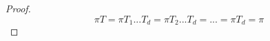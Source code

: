 \begin{proof}
	\begin{equation*}
		\pi T = \pi T_1...T_d = \pi T_2...T_d = ... = \pi T_d = \pi
	\end{equation*}
\end{proof}
























































